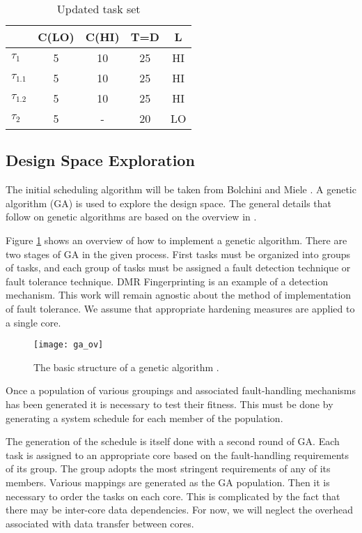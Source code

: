 \begin{table}
\centering
\caption{Updated task set}
\begin{tabular}{@{}l|cccc@{}}
\toprule
		& C(LO) & C(HI) & T=D & L	 \\\bottomrule
$\tau_1$ & 5 & 10 & 25 & HI  \\
$\tau_{1.1}$ & 5 & 10 & 25 & HI  \\
$\tau_{1.2}$ & 5 & 10 & 25 & HI  \\
$\tau_2$ & 5 & - & 20 & LO  \\
\end{tabular}
\end{table}


\subsection{Design Space Exploration}

The initial scheduling algorithm will be taken from Bolchini and  Miele \cite{bolchini2013reliability}. A genetic algorithm (GA) is used to explore the design space. The general details that follow on genetic algorithms are based on the overview in \cite{geatbx}.

Figure \ref{f:ga_ov} shows an overview of how to implement a genetic algorithm. There are two stages of GA in the given process. First tasks must be organized into groups of tasks, and each group of tasks must be assigned a fault detection technique or fault tolerance technique. DMR Fingerprinting is an example of a detection mechanism. This work will remain agnostic about the method of implementation of fault tolerance. We assume that appropriate hardening measures are applied to a single core.
 
\begin{figure}[h]
\centering
\texttt{[image: ga\_ov]}
\caption{The basic structure of a genetic algorithm \cite{geatbx}.}
\label{f:ga_ov}
\end{figure}

Once a population of various groupings and associated fault-handling mechanisms has been generated it is necessary to test their fitness. This must be done by generating a system schedule for each member of the population. 

The generation of the schedule is itself done with a second round of GA. Each task is assigned to an appropriate core based on the fault-handling requirements of its group. The group adopts the most stringent requirements of any of its members. Various mappings are generated as the GA population. Then it is necessary to order the tasks on each core. This is complicated by the fact that there may be inter-core data dependencies. For now, we will neglect the overhead associated with data transfer between cores.

